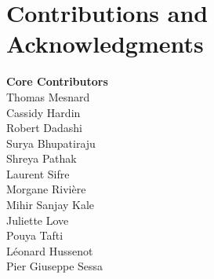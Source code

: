 \clearpage

\section{Contributions and Acknowledgments}

\noindent\textbf{Core Contributors} \\
Thomas Mesnard \\
Cassidy Hardin \\
Robert Dadashi \\
Surya Bhupatiraju \\
Shreya Pathak \\
Laurent Sifre \\
Morgane Rivière \\
Mihir Sanjay Kale \\
Juliette Love \\
Pouya Tafti \\
Léonard Hussenot \\
Pier Giuseppe Sessa

